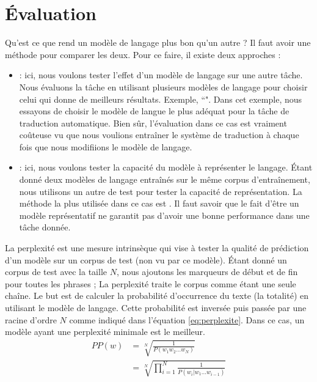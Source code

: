 \documentclass{KodeBook}
\begin{document}
\section{Évaluation}

Qu'est ce que rend un modèle de langage plus bon qu'un autre ? 
Il faut avoir une méthode pour comparer les deux. 
Pour ce faire, il existe deux approches : 
	\begin{itemize}
		\item {} : ici, nous voulons tester l'effet d'un modèle de langage sur une autre tâche. 
		Nous évaluons la tâche en utilisant plusieurs modèles de langage pour choisir celui qui donne de meilleurs résultats.
		Exemple, ``". 
		Dans cet exemple, nous essayons de choisir le modèle de langue le plus adéquat pour la tâche de traduction automatique.
		Bien sûr, l'évaluation dans ce cas est vraiment coûteuse vu que nous voulions entraîner le système de traduction à chaque fois que nous modifiions le modèle de langage.
		
		\item {} : ici, nous voulons tester la capacité du modèle à représenter le langage. 
		Étant donné deux modèles de langage entraînés sur le même corpus d'entraînement, nous utilisons un autre de test pour tester la capacité de représentation.
		La méthode la plus utilisée dans ce cas est .
		Il faut savoir que le fait d'être un modèle représentatif ne garantit pas d'avoir une bonne performance dans une tâche donnée.
	\end{itemize}


La perplexité est une mesure intrinsèque qui vise à tester la qualité de prédiction d'un modèle sur un corpus de test (non vu par ce modèle). 
Étant donné un corpus de test avec la taille $N$, nous ajoutons les marqueurs de début et de fin pour toutes les phrases ; La perplexité traite le corpus comme étant une seule chaîne. 
Le but est de calculer la probabilité d'occurrence du texte (la totalité) en utilisant le modèle de langage. 
Cette probabilité est inversée puis passée par une racine d'ordre $N$ comme indiqué dans l'équation \ref{eq:perplexite}.
Dans ce cas, un modèle ayant une perplexité minimale est le meilleur.
%
\begin{align}
	PP(w) & = \sqrt[N]{\frac{1}{P(w_1 w_2 \ldots w_N)}} \nonumber\\
	 & = \sqrt[N]{\prod\limits_{i=1}^{N}\frac{1}{P(w_i | w_1 \ldots w_{i-1})}} \label{eq:perplexite}
\end{align}
\end{document}
